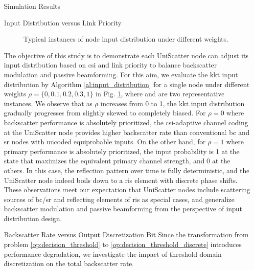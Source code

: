 \documentclass[journal]{IEEEtran}
\begin{document}
\begin{section}{Simulation Results}
	\begin{subsection}{Input Distribution versus Link Priority}
		\begin{figure}[!t]
			\centering
			\caption{Typical instances of node input distribution under different weights.}
			\label{fi:distribution_weights}
		\end{figure}
		The objective of this study is to demonstrate each UniScatter node can adjust its input distribution based on \gls{csi} and link priority to balance backscatter modulation and passive beamforming.
		For this aim, we evaluate the \gls{kkt} input distribution by Algorithm \ref{al:input_distribution} for a single node under different weights $\rho=\{0,0.1,0.2,0.3,1\}$ in Fig. \ref{fi:distribution_weights}, where  and  are two representative instances.
		We observe that as $\rho$ increases from \num{0} to \num{1}, the \gls{kkt} input distribution
		gradually progresses from slightly skewed to completely biased.
		For $\rho=0$ where backscatter performance is absolutely prioritized, the \gls{csi}-adaptive channel coding at the UniScatter node provides higher backscatter rate than conventional \gls{bc} and \gls{sr} nodes with uncoded equiprobable inputs.
		On the other hand, for $\rho=1$ where primary performance is absolutely prioritized, the input probability is \num{1} at the state that maximizes the equivalent primary channel strength, and \num{0} at the others.
		In this case, the reflection pattern over time is fully deterministic, and the UniScatter node indeed boils down to a \gls{ris} element with discrete phase shifts.
		These observations meet our expectation that UniScatter nodes include scattering sources of \gls{bc}/\gls{sr} and reflecting elements of \gls{ris} as special cases, and generalize backscatter modulation and passive beamforming from the perspective of input distribution design.
	\end{subsection}

	\begin{subsection}{Backscatter Rate versus Output Discretization Bit}
		Since the transformation from problem \eqref{op:decision_threshold} to \eqref{op:decision_threshold_discrete} introduces performance degradation, we investigate the impact of threshold domain discretization on the total backscatter rate.


\end{subsection}
\end{section}
\end{document}
